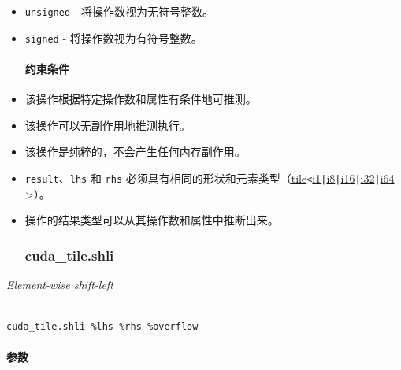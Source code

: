 \documentclass{article}
\begin{document}
\begin{itemize}
\item \texttt{unsigned} - 将操作数视为无符号整数。
\item \texttt{signed} - 将操作数视为有符号整数。




\paragraph{约束条件}


\item 该操作根据特定操作数和属性有条件地可推测。
\item 该操作可以无副作用地推测执行。
\item 该操作是纯粹的，不会产生任何内存副作用。
\item \texttt{result}、\texttt{lhs} 和 \texttt{rhs} 必须具有相同的形状和元素类型（\href{https://docs.nvidia.com/cuda/tile-ir/latest/sections/types.html#type-tile}{tile}\texttt{<}\href{https://docs.nvidia.com/cuda/tile-ir/latest/sections/types.html#subsection-element-types}{i1}\texttt{|}\href{https://docs.nvidia.com/cuda/tile-ir/latest/sections/types.html#subsection-element-types}{i8}\texttt{|}\href{https://docs.nvidia.com/cuda/tile-ir/latest/sections/types.html#subsection-element-types}{i16}\texttt{|}\href{https://docs.nvidia.com/cuda/tile-ir/latest/sections/types.html#subsection-element-types}{i32}\texttt{|}\href{https://docs.nvidia.com/cuda/tile-ir/latest/sections/types.html#subsection-element-types}{i64} >）。
\item 操作的结果类型可以从其操作数和属性中推断出来。




\subsubsection{cuda\_tile.shli}


\end{itemize}
\textit{Element-wise shift-left}




\begin{lstlisting}

cuda_tile.shli %lhs %rhs %overflow

\end{lstlisting}



\paragraph{参数}
\end{document}
